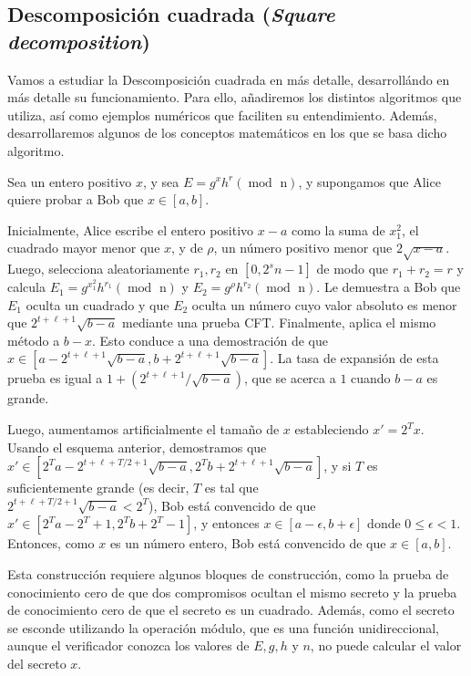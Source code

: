 \subsection{Descomposición cuadrada (\emph{Square decomposition})}

Vamos a estudiar la Descomposición cuadrada en más detalle, desarrollándo en más detalle su funcionamiento. Para ello, añadiremos los distintos algoritmos que utiliza, así como ejemplos numéricos que faciliten su entendimiento. Además, desarrollaremos algunos de los conceptos matemáticos en los que se basa dicho algoritmo.

Sea un entero positivo $x$, y sea $E = g^{x}h^{r} (\operatorname{mod} \text{ n})$, y supongamos que Alice quiere probar a Bob que $x \in [a, b]$.

Inicialmente, Alice escribe el entero positivo $x-a$ como la suma de $x_{1}^{2}$, el cuadrado mayor menor que $x$, y de $\rho$, un número positivo menor que $2\sqrt{x-a}$. Luego, selecciona aleatoriamente $r_{1}, r_{2}$ en $[0, 2^{s}n-1]$ de modo que $r_{1} + r_{2} = r$ y calcula $E_{1} = g^{x_{1}^{2}}h^{r_{1}} (\operatorname{mod} \text{ n})$ y $E_{2} = g^{\rho}h^{r_{2}} (\operatorname{mod} \text{ n})$. Le demuestra a Bob que $E_{1}$ oculta un cuadrado y que $E_{2}$ oculta un número cuyo valor absoluto es menor que $2^{t+\ell+1}\sqrt{b-a}$ mediante una prueba CFT. Finalmente, aplica el mismo método a $b-x$. Esto conduce a una demostración de que $x \in [a - 2^{t+\ell+1}\sqrt{b-a}, b + 2^{t+\ell+1}\sqrt{b-a}]$. La tasa de expansión de esta prueba es igual a $1 + (2^{t+\ell+1}/\sqrt{b-a})$, que se acerca a $1$ cuando $b-a$ es grande.

Luego, aumentamos artificialmente el tamaño de $x$ estableciendo $x' = 2^{T}x$. Usando el esquema anterior, demostramos que $x' \in [2^{T}a - 2^{t+\ell+T / 2+1} \sqrt{b-a}, 2^{T}b + 2^{t+\ell+1} \sqrt{b-a}]$, y si $T$ es suficientemente grande (es decir, $T$ es tal que \\ $2^{t+\ell+T/2+1} \sqrt{b-a} < 2^{T}$), Bob está convencido de que $x' \in [2^{T}a - 2^{T} + 1, 2^{T}b + 2^{T} - 1]$, y entonces $x \in [a - \epsilon, b + \epsilon]$ donde $0 \leq \epsilon < 1$. Entonces, como $x$ es un número entero, Bob está convencido de que $x \in [a, b]$.

Esta construcción requiere algunos bloques de construcción, como la prueba de conocimiento cero de que dos compromisos ocultan el mismo secreto y la prueba de conocimiento cero de que el secreto es un cuadrado. Además, como el secreto se esconde utilizando la operación módulo, que es una función unidireccional, aunque el verificador conozca los valores de $E, g, h$ y $n$, no puede calcular el valor del secreto $x$.

